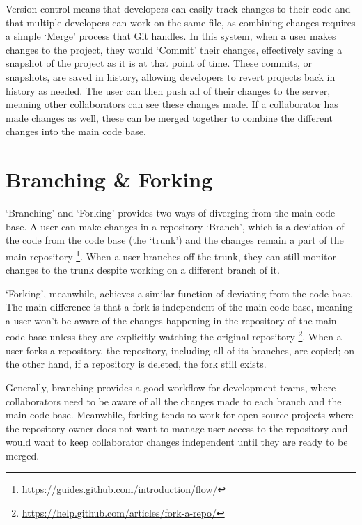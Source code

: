 Version control means that developers can easily track changes to their code and that multiple developers can work on the same file, as combining changes requires a simple `Merge' process that Git handles. In this system, when a user makes changes to the project, they would `Commit' their changes, effectively saving a snapshot of the project as it is at that point of time. These commits, or snapshots, are saved in history, allowing developers to revert projects back in history as needed. The user can then push all of their changes to the server, meaning other collaborators can see these changes made. If a collaborator has made changes as well, these can be merged together to combine the different changes into the main code base.

\section{Branching \& Forking}
`Branching' and `Forking' provides two ways of diverging from the main code base. A user can make changes in a repository `Branch', which is a deviation of the code from the code base (the `trunk') and the changes remain a part of the main repository \footnote{\url{https://guides.github.com/introduction/flow/}}. When a user branches off the trunk, they can still monitor changes to the trunk despite working on a different branch of it.

`Forking', meanwhile, achieves a similar function of deviating from the code base. The main difference is that a fork is independent of the main code base, meaning a user won't be aware of the changes happening in the repository of the main code base unless they are explicitly watching the original repository \footnote{\url{https://help.github.com/articles/fork-a-repo/}}. When a user forks a repository, the repository, including all of its branches, are copied; on the other hand, if a repository is deleted, the fork still exists.

Generally, branching provides a good workflow for development teams, where collaborators need to be aware of all the changes made to each branch and the main code base. Meanwhile, forking tends to work for open-source projects where the repository owner does not want to manage user access to the repository and would want to keep collaborator changes independent until they are ready to be merged.

